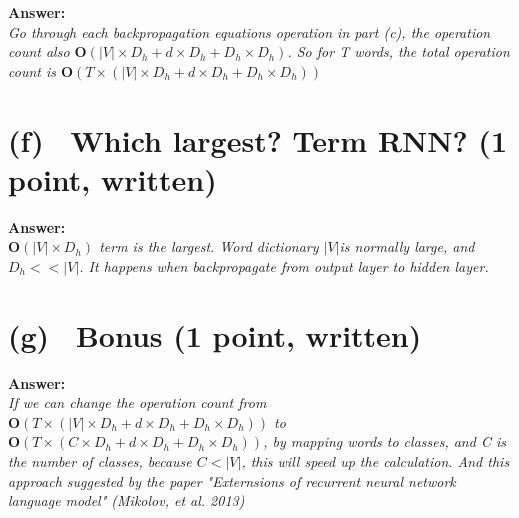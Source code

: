 \documentclass[fleqn]{MJD}
\newcommand{\subproblem}[2]{\section{(#1)~ #2}}
\newcommand{\0}{\emptyset}
\begin{document}
\noindent \textbf{Answer:}  \\
\indent \textit {Go through each backpropagation equations operation in part (c), the operation count also $\bm{O}(|V| \times D_h + d \times D_h + D_h \times D_h)$.  So for T words, the total operation count is $\bm{O}(T \times (|V| \times D_h + d \times D_h + D_h \times D_h))$}

\subproblem{f}{Which largest? Term RNN? (1 point, written)}

\noindent \textbf{Answer:}  \\
\indent \textit {$\bm{O}(|V| \times D_h)$ term is the largest. Word dictionary $|V|$is normally large, and $D_h << |V|$. It happens when backpropagate from output layer to hidden layer.}

\subproblem{g}{Bonus (1 point, written)}
\noindent \textbf{Answer:} \\
\textit {If we can change the operation count from  $\bm{O}(T \times (|V| \times D_h + d \times D_h + D_h \times D_h))$ to  $\bm{O}(T \times (C \times D_h + d \times D_h + D_h \times D_h))$, by mapping words to classes, and C  is the number of classes, because $C<|V|$, this will speed up the calculation. And this approach suggested by the paper "Externsions of recurrent neural network language model" (Mikolov, et al. 2013) 
}
\end{document}
